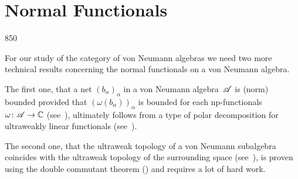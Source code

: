 \section{Normal Functionals}
\begin{parsec}{850}%
\begin{point}{10}%
For our study of the category of von Neumann algebras
we need two more technical results
concerning the normal functionals
on a von Neumann algebra.

The first one,
that a net $(b_\alpha)_\alpha$
in a von Neumann algebra~$\mathscr{A}$ is (norm) bounded
provided that $(\omega(b_\alpha))_\alpha$
is bounded for each np-functionals $\omega\colon \mathscr{A}\to\mathbb{C}$
(see~),
ultimately
follows from a type of polar decomposition for 
ultraweakly linear functionals (see~).

The second one,
that the ultraweak topology of a von Neumann subalgebra
coincides with the ultraweak topology of the surrounding space
(see~),
is proven using the double commutant theorem ()
and requires a lot of hard work.
\end{point}
\end{parsec}
